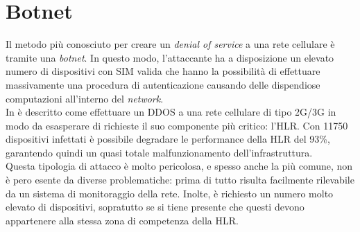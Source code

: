 \section{Botnet}
Il metodo più conosciuto per creare un \textit{denial of service} a una rete cellulare è tramite una \textit{botnet}.
In questo modo, l'attaccante ha a disposizione un elevato numero di dispositivi con SIM valida che hanno la possibilità di effettuare massivamente una procedura
di autenticazione causando delle dispendiose computazioni all'interno del \textit{network}.\\
In \cite{measuring-dos} è descritto come effettuare un DDOS a una rete cellulare di tipo 2G/3G in modo da esasperare di richieste il suo componente più critico: l'HLR.
Con 11750 dispositivi infettati è possibile degradare le performance della HLR del 93\%\cite{measuring-dos}, garantendo quindi un quasi totale malfunzionamento dell'infrastruttura.\\
Questa tipologia di attacco è molto pericolosa, e spesso anche la più comune, non è pero esente da diverse problematiche: prima di tutto risulta facilmente rilevabile da un sistema di 
monitoraggio della rete. Inolte, è richiesto un numero molto elevato di dispositivi, sopratutto se si tiene presente che questi devono 
appartenere alla stessa zona di competenza della HLR.\\

